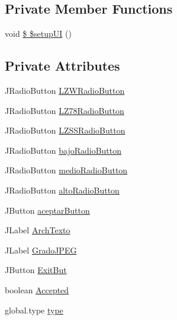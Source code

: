 \subsection*{Private Member Functions}
\begin{DoxyCompactItemize}
\item 
void \hyperlink{classpresentacion_1_1form_1_1PopUp__Comp_a6742ee8edc772104c5d78f3eb5888b49}{\$ \$setup\+UI} ()
\end{DoxyCompactItemize}
\subsection*{Private Attributes}
\begin{DoxyCompactItemize}
\item 
J\+Radio\+Button \hyperlink{classpresentacion_1_1form_1_1PopUp__Comp_a810fe251f9c88e3b83ce466feafafe2e}{L\+Z\+W\+Radio\+Button}
\item 
J\+Radio\+Button \hyperlink{classpresentacion_1_1form_1_1PopUp__Comp_ac750ecbde516e2fee470693124d2ff63}{L\+Z78\+Radio\+Button}
\item 
J\+Radio\+Button \hyperlink{classpresentacion_1_1form_1_1PopUp__Comp_ad18c1029f04cc43d033183dca943977c}{L\+Z\+S\+S\+Radio\+Button}
\item 
J\+Radio\+Button \hyperlink{classpresentacion_1_1form_1_1PopUp__Comp_add9532658d448dcbfa9b7dd40ddc8b38}{bajo\+Radio\+Button}
\item 
J\+Radio\+Button \hyperlink{classpresentacion_1_1form_1_1PopUp__Comp_ad1daa09264648f37642b24a698e32206}{medio\+Radio\+Button}
\item 
J\+Radio\+Button \hyperlink{classpresentacion_1_1form_1_1PopUp__Comp_a9f49f4c6ce6d4f60a7015d8699aef151}{alto\+Radio\+Button}
\item 
J\+Button \hyperlink{classpresentacion_1_1form_1_1PopUp__Comp_a6321172d7f93f607a1cea6e2eee6a6ea}{aceptar\+Button}
\item 
J\+Label \hyperlink{classpresentacion_1_1form_1_1PopUp__Comp_a1b40d49127cf9752ea464d6660f04673}{Arch\+Texto}
\item 
J\+Label \hyperlink{classpresentacion_1_1form_1_1PopUp__Comp_acf726751a39641f547274bfe8176fedd}{Grado\+J\+P\+EG}
\item 
J\+Button \hyperlink{classpresentacion_1_1form_1_1PopUp__Comp_aad0de868daa06f82567784941064f12d}{Exit\+But}
\item 
boolean \hyperlink{classpresentacion_1_1form_1_1PopUp__Comp_af8e9310f7ff94d5a8cc917c66536bfde}{Accepted}
\item 
global.\+type \hyperlink{classpresentacion_1_1form_1_1PopUp__Comp_af1981117e5555e0308d7e4a0f61db50b}{type}
\end{DoxyCompactItemize}


